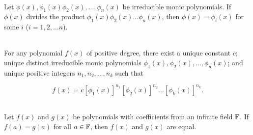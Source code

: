 \begin{alphasection}
	\begin{corollary}
		\hfill\\
		Let $\phi(x),\phi_1(x)\phi_2(x), \dots, \phi_n(x)$ be irreducible monic polynomials. If $\phi(x)$ divides the product $\phi_1(x) \phi_2(x) \dots \phi_n(x)$, then $\phi(x) = \phi_i(x)$ for some $i$ ($i = 1, 2, \dots n$).
	\end{corollary}

	\begin{theorem}
		\hfil\\
		For any polynomial $f(x)$ of positive degree, there exist a unique constant $c$; unique distinct irreducible monic polynomials $\phi_1(x),\phi_2(x), \dots, \phi_n(x)$; and unique positive integers $n_1, n_2, \dots, n_k$ such that

		\[f(x) = c[\phi_1(x)]^{n_1} [\phi_2(x)]^{n_2} \dots [\phi_k(x)]^{n_k}.\]
	\end{theorem}

	\begin{theorem}
		\hfill\\
		Let $f(x)$ and $g(x)$ be polynomials with coefficients from an infinite field $\mathbb{F}$. If $f(a)= g(a)$ for all $a \in \mathbb{F}$, then $f(x)$ and $g(x)$ are equal.
	\end{theorem}
\end{alphasection}
